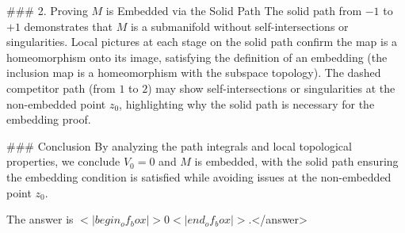 ### 2. Proving \( M \) is Embedded via the Solid Path  
The solid path from \(-1\) to \(+1\) demonstrates that \( M \) is a submanifold without self-intersections or singularities. Local pictures at each stage on the solid path confirm the map is a homeomorphism onto its image, satisfying the definition of an embedding (the inclusion map is a homeomorphism with the subspace topology). The dashed competitor path (from \(1\) to \(2\)) may show self-intersections or singularities at the non-embedded point \( z_0 \), highlighting why the solid path is necessary for the embedding proof.  

### Conclusion  
By analyzing the path integrals and local topological properties, we conclude \( V_0 = 0 \) and \( M \) is embedded, with the solid path ensuring the embedding condition is satisfied while avoiding issues at the non-embedded point \( z_0 \).  

The answer is \(<|begin_of_box|>0<|end_of_box|>\).</answer>